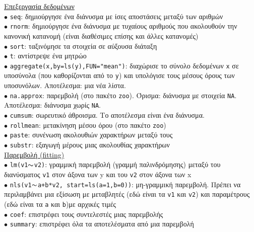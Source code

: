 \documentclass[a4paper,10pt,twocolumn]{article}
\begin{document}
\noindent \underline{Επεξεργασία δεδομένων}\\
$\bullet$ \texttt{seq}: δημιούργησε ένα διάνυσμα με ίσες αποστάσεις μεταξύ των αριθμών\\
$\bullet$ \texttt{rnorm}: δημιούργησε ένα διάνυσμα με τυχαίους αριθμούς που ακολουθούν την κανονική κατανομή
(είναι διαθέσιμες επίσης και άλλες κατανομές)\\
$\bullet$ \texttt{sort}: ταξινόμησε τα στοιχεία σε αύξουσα διάταξη\\
$\bullet$ \texttt{t}: αντίστρεψε ένα μητρώο\\
$\bullet$ \texttt{aggregate(x,by=ls(y),FUN="mean")}: διαχώρισε το σύνολο δεδομένων \texttt{x} σε υποσύνολα
(που καθορίζονται από το \texttt{y}) και υπολόγισε τους μέσους όρους των υποσυνόλων. Αποτέλεσμα: μια νέα
λίστα.\\
$\bullet$ \texttt{na.approx}: παρεμβολή (στο πακέτο \texttt{zoo}). Όρισμα: διάνυσμα με στοιχεία \texttt{NA}.
Αποτέλεσμα: διάνυσμα χωρίς \texttt{NA}.\\
$\bullet$ \texttt{cumsum}: σωρευτικό άθροισμα. Το αποτέλεσμα είναι ένα διάνυσμα.\\
$\bullet$ \texttt{rollmean}: μετακίνηση μέσου όρου (στο πακέτο \texttt{zoo})\\
$\bullet$ \texttt{paste}: συνένωση ακολουθιών χαρακτήρων μεταξύ τους\\
$\bullet$ \texttt{substr}: εξαγωγή μέρους μιας ακολουθίας χαρακτήρων\\

\noindent \underline{Παρεμβολή (fitting)}\\
$\bullet$ \texttt{lm(v1}$\thicksim$\texttt{v2)}: γραμμική παρεμβολή (γραμμή παλινδρόμησης) μεταξύ του
διανύσματος \texttt{v1} στον άξονα των y και του \texttt{v2} στον άξονα των x\\
$\bullet$ \texttt{nls(v1}$\thicksim$\texttt{a+b*v2, start=ls(a=1,b=0))}: μη-γραμμική παρεμβολή. Πρέπει να 
περιλαμβάνει μια εξίσωση με μεταβλητές (εδώ είναι τα \texttt{v1} και \texttt{v2}) και παραμέτρους (εδώ
είναι τα \texttt{a} και \texttt{b})με αρχικές τιμές\\
$\bullet$ \texttt{coef}: επιστρέφει τους συντελεστές μιας παρεμβολής\\
$\bullet$ \texttt{summary}: επιστρέφει όλα τα αποτελέσματα από μια παρεμβολή\\
\end{document}
